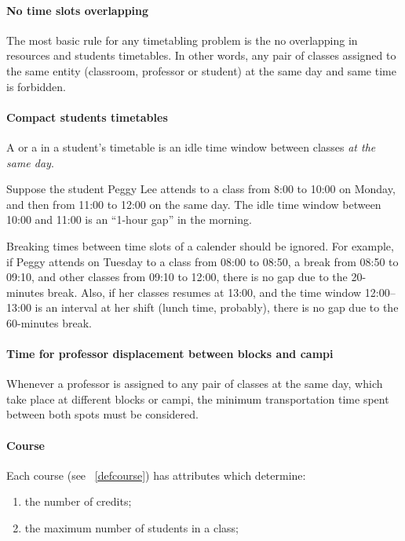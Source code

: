 \paragraph{No time slots overlapping}
\label{constroverlap}

The most basic rule for any timetabling problem is the no overlapping in resources and students timetables. In other words, any pair of classes assigned to the same entity (classroom, professor or student) at the same day and same time is forbidden.


\paragraph{Compact students timetables}
\label{constrmingapstudent}

A  or a  in a student's timetable is an idle time window between classes \textit{at the same day}.

Suppose the student Peggy Lee attends to a class from 8:00 to 10:00 on Monday, and then from 11:00 to 12:00 on the same day. The idle time window between 10:00 and 11:00 is an ``1-hour gap'' in the morning.

Breaking times between time slots of a calender should be ignored. For example, if Peggy attends on Tuesday to a class from 08:00 to 08:50, a break from 08:50 to 09:10, and other classes from 09:10 to 12:00, there is no gap due to the 20-minutes break. Also, if her classes resumes at 13:00, and the time window 12:00--13:00 is an interval at her shift (lunch time, probably), there is no gap due to the 60-minutes break.


\paragraph{Time for professor displacement between blocks and campi}
\label{constrprofdisplactime}

Whenever a professor is assigned to any pair of classes at the same day, which take place at different blocks or campi, the minimum transportation time spent between both spots must be considered.


\paragraph{Course}
\label{constrcourse}

Each course (see ~\ref{defcourse}) has attributes which determine:

\begin{enumerate}
\item the number of credits;
\item the maximum number of students in a class;
\end{enumerate}


